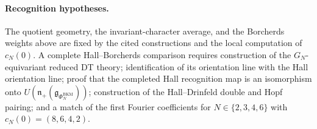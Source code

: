 \paragraph{Recognition hypotheses.}
The quotient geometry, the invariant-character average, and the
Borcherds weights above are fixed by the cited constructions and the
local computation of $c_N(0)$.  A complete Hall--Borcherds comparison
requires construction of the $G_N$-equivariant reduced DT theory;
identification of its orientation line with the Hall orientation line;
proof that the completed Hall recognition map is an isomorphism onto
$U(\mathfrak{n}_{+}(\mathfrak{g}_{\Phi_N^{\mathrm{BKM}}}))$; construction
of the Hall--Drinfeld double and Hopf pairing; and a match of the first
Fourier coefficients for $N\in\{2,3,4,6\}$ with
$c_N(0)=(8,6,4,2)$.
